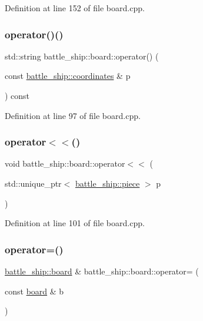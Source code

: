 Definition at line 152 of file board.\+cpp.

\mbox{\label{classbattle__ship_1_1board_ade89ae8272e10d6c47a8d4f2c2927d0a}} 
\subsubsection{\texorpdfstring{operator()()}{operator()()}}
{\footnotesize\ttfamily std\+::string battle\+\_\+ship\+::board\+::operator() (\begin{DoxyParamCaption}\item[{const \hyperlink{structbattle__ship_1_1coordinates}{battle\+\_\+ship\+::coordinates} \&}]{p }\end{DoxyParamCaption}) const}



Definition at line 97 of file board.\+cpp.

\mbox{\label{classbattle__ship_1_1board_a9afa4baeef0df47e4a2efe05de9cb8eb}} 
\subsubsection{\texorpdfstring{operator$<$$<$()}{operator<<()}}
{\footnotesize\ttfamily void battle\+\_\+ship\+::board\+::operator$<$$<$ (\begin{DoxyParamCaption}\item[{std\+::unique\+\_\+ptr$<$ \hyperlink{classbattle__ship_1_1piece}{battle\+\_\+ship\+::piece} $>$}]{p }\end{DoxyParamCaption})}



Definition at line 101 of file board.\+cpp.

\mbox{\label{classbattle__ship_1_1board_a4349c045147f686d09cdc47690f15e34}} 
\subsubsection{\texorpdfstring{operator=()}{operator=()}\hspace{0.1cm}{\footnotesize\ttfamily [1/2]}}
{\footnotesize\ttfamily \hyperlink{classbattle__ship_1_1board}{battle\+\_\+ship\+::board} \& battle\+\_\+ship\+::board\+::operator= (\begin{DoxyParamCaption}\item[{const \hyperlink{classbattle__ship_1_1board}{board} \&}]{b }\end{DoxyParamCaption})}




